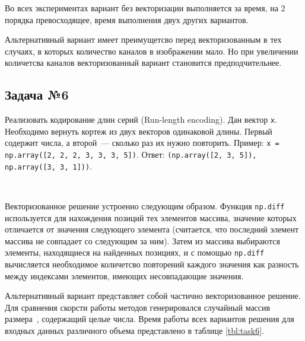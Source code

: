 \documentclass{article}
\begin{document}
\analysis

Во всех экспериментах вариант без векторизации выполняется за время, на 2 порядка превосходящее,
время выполнения двух других вариантов. 

Альтернативный вариант имеет преимущетсво перед векторизованным в тех случаях, в которых
количество каналов в изображении мало. Но при увеличении количетсва каналов векторизованный 
вариант становится предподчительнее.


\subsection{Задача №6}

\taskdesc
Реализовать кодирование длин серий (Run-length encoding). Дан вектор \verb"x". Необходимо вернуть кортеж из
двух векторов одинаковой длины. Первый содержит числа, а второй~--- сколько раз их нужно повторить.
Пример: \verb"x = np.array([2, 2, 2, 3, 3, 3, 5])". Ответ: \verb"(np.array([2, 3, 5]), np.array([3, 3, 1]))".

\soldesc\\
\begin{minipage}{\linewidth}

\end{minipage}
\begin{minipage}{\linewidth}

\end{minipage}
\begin{minipage}{\linewidth}

\end{minipage}

Векторизованное решение устроенно следующим образом. Функция \verb"np.diff" используется для
нахождения позиций тех элементов массива, значение которых отличается от значения следующего 
элемента (считается, что последний элемент массива не совпадает со следующим за ним). 
Затем из массива выбираются элементы, находящиеся на найденных позициях, и с
помощью \verb"np.diff" вычисляется необходимое количетсво повторений каждого значения как разность
между индексами элементов, имеющих несовпадающие значения.

Альтернативный вариант представляет собой частично векторизованное решение.
\testing
Для сравнения скорсти работы методов генерировался случайный массив размера~, содержащий 
целые числа.
Время работы всех вариантов решения для входных данных различного объема представлено в таблице \ref{tbl:task6}.
\end{document}
